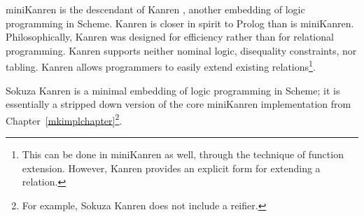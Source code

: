 miniKanren is the descendant of Kanren \cite{kanrensite}, another
embedding of logic programming in Scheme.  Kanren is closer in spirit
to Prolog than is miniKanren.  Philosophically, Kanren was designed
for efficiency rather than for relational programming. Kanren 
supports neither nominal logic, disequality constraints, nor tabling. Kanren
allows programmers to easily extend existing relations\footnote{This
  can be done in miniKanren as well, through the technique of function
  extension. However, Kanren provides an explicit form for extending a
  relation.}.

Sokuza Kanren is a minimal embedding of logic programming in Scheme;
it is essentially a stripped down version of the core miniKanren
implementation from Chapter~\ref{mkimplchapter}\footnote{For example,
  Sokuza Kanren does not include a reifier.}.


















